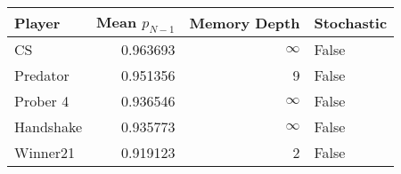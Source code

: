 \begin{tabular}{lrrl}
\toprule
    Player &  Mean $p_{N-1}$ &  Memory Depth & Stochastic \\
\midrule
        CS &        0.963693 &            \(\infty\) &      False \\
  Predator &        0.951356 &             9 &      False \\
  Prober 4 &        0.936546 &            \(\infty\) &      False \\
 Handshake &        0.935773 &            \(\infty\) &      False \\
  Winner21 &        0.919123 &             2 &      False \\
\bottomrule
\end{tabular}
